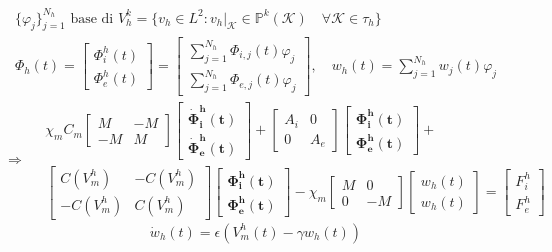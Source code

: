 \documentclass[a4paper]{article}
\begin{document}
\begin{equation*}
\begin{gathered}
\{\varphi_j\}_{j=1}^{N_h} \text{ base di } V_h^k = \{v_h \in L^2 : v_h|_\mathcal{K} \in \mathbb{P}^{k}(\mathcal{K})  \quad \forall \mathcal{K} \in \tau_h \}
\\
\Phi_h(t) = \begin{bmatrix} \Phi_i^h(t) \\ \Phi_e^h(t) \end{bmatrix} = \begin {bmatrix}\sum_{j=1}^{N_h} \Phi_{i,j}(t)\varphi_j \\ \sum_{j=1}^{N_h} \Phi_{e,j}(t)\varphi_j \end{bmatrix},
 \quad w_h(t) = \sum_{j=1}^{N_h}w_j(t)\varphi_j
\end{gathered}
\end{equation*}
\vspace{3mm}
\begin{equation}
\Rightarrow \quad
\boxed{
\begin{gathered}
 \chi_mC_m \begin{bmatrix}M &-M \\ -M & M \end{bmatrix}
	\begin{bmatrix}\bm{\dot{\Phi}_i^h(t)} \\ \bm{\dot{\Phi}_e^h(t)} \end{bmatrix}
	 + \begin{bmatrix}A_i & 0 \\ 0 & A_e \end{bmatrix}
	 \begin{bmatrix}\bm{\Phi_i^h(t)} \\ \bm{\Phi_e^h(t)} \end{bmatrix} +\\
	   \begin{bmatrix}C(V_m^h) & -C(V_m^h) \\ -C(V_m^h) & C(V_m^h) \end{bmatrix} 
	   \begin{bmatrix} \bm{\Phi_i^h(t)} \\ \bm{\Phi_e^h(t)}  \end{bmatrix} 
	   -\chi_m \begin{bmatrix}M & 0 \\ 0 & -M \end{bmatrix} 
	   	\begin{bmatrix}w_h(t) \\ w_h(t) \end{bmatrix} = 
	   	\begin{bmatrix} F_i^h \\ F_e^h\end{bmatrix}
\end{gathered}
}
\end{equation}
\begin{equation}
\boxed{\dot{w}_h(t) = \epsilon(V_m^h(t) - \gamma w_h(t))}
\end{equation}
\vspace{5mm}
\end{document}
